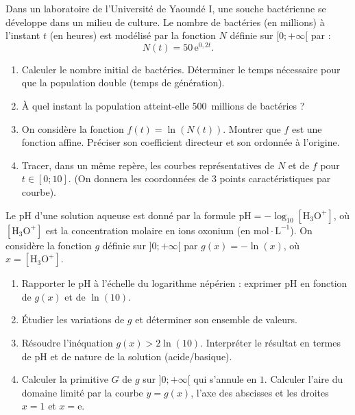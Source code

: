 \documentclass[11pt]{article}
\begin{document}
\begin{exercice}
Dans un laboratoire de l'Université de Yaoundé I, une souche bactérienne se développe dans un milieu de culture. Le nombre de bactéries (en millions) à l'instant $t$ (en heures) est modélisé par la fonction $N$ définie sur $[0; +\infty[$ par :
\[ N(t) = 50\,\mathrm{e}^{0,2t}. \]
\begin{enumerate}
    \item Calculer le nombre initial de bactéries. Déterminer le temps nécessaire pour que la population double (temps de génération). 
    \item À quel instant la population atteint-elle \SI{500}{millions} de bactéries ? 
    \item On considère la fonction $f(t) = \ln(N(t))$. Montrer que $f$ est une fonction affine. Préciser son coefficient directeur et son ordonnée à l'origine. 
    \item Tracer, dans un même repère, les courbes représentatives de $N$ et de $f$ pour $t \in [0; 10]$. (On donnera les coordonnées de 3 points caractéristiques par courbe).
\end{enumerate}
\end{exercice}

\begin{exercice}
Le pH d'une solution aqueuse est donné par la formule $\mathrm{pH} = -\log_{10}[\mathrm{H_3O^+}]$, où $[\mathrm{H_3O^+}]$ est la concentration molaire en ions oxonium (en $\mathrm{mol\cdot L^{-1}}$). On considère la fonction $g$ définie sur $]0; +\infty[$ par $g(x) = -\ln(x)$, où $x = [\mathrm{H_3O^+}]$.
\begin{enumerate}
    \item Rapporter le pH à l'échelle du logarithme népérien : exprimer $\mathrm{pH}$ en fonction de $g(x)$ et de $\ln(10)$.
    \item Étudier les variations de $g$ et déterminer son ensemble de valeurs. 
    \item Résoudre l'inéquation $g(x) > 2\ln(10)$. Interpréter le résultat en termes de pH et de nature de la solution (acide/basique).
    \item Calculer la primitive $G$ de $g$ sur $]0; +\infty[$ qui s'annule en $1$. Calculer l'aire du domaine limité par la courbe $y=g(x)$, l'axe des abscisses et les droites $x=1$ et $x=\mathrm{e}$.
\end{enumerate}
\end{exercice}
\end{document}
